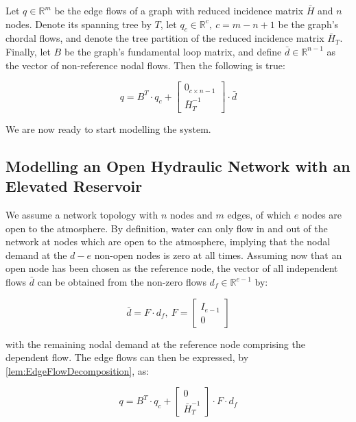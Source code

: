 \begin{lemma}\label{lem:EdgeFlowDecomposition}
	Let $q \in \mathbb{R}^m$ be the edge flows of a graph with reduced incidence matrix $\bar{H}$ and $n$ nodes. Denote its spanning tree by $T$, let $q_c \in \mathbb{R}^c, \ c = m-n+1$ be the graph's chordal flows, and denote the tree partition of the reduced incidence matrix $\bar{H}_T$. Finally, let $B$ be the graph's fundamental loop matrix, and define $\bar{d} \in \mathbb{R}^{n-1}$ as the vector of non-reference nodal flows. Then the following is true:
	
	\begin{equation}\label{eq:EdgeFlowDecomposition}
		q = B^T\cdot q_c +
		\begin{bmatrix}
			0_{c \times n-1} \\ \bar{H}_T^{-1} 
		\end{bmatrix}
		\cdot \bar{d}
	\end{equation}
\end{lemma}

We are now ready to start modelling the system.

\subsection{Modelling an Open Hydraulic Network with an Elevated Reservoir}\label{subsec:ModelWithTank}

We assume a network topology with $n$ nodes and $m$ edges, of which $e$ nodes are open to the atmosphere. By definition, water can only flow in and out of the network at nodes which are open to the atmosphere, implying that the nodal demand at the $d-e$ non-open nodes is zero at all times. Assuming now that an open node has been chosen as the reference node, the vector of all independent flows $\bar{d}$ can be obtained from the non-zero flows $d_f \in \mathbb{R}^{e-1}$ by:

\begin{equation}\label{eq:IndependentFlows}
	\bar{d} = F\cdot d_f, \ F = \begin{bmatrix}
		I_{e-1} \\ 0
	\end{bmatrix}
\end{equation}

with the remaining nodal demand at the reference node comprising the dependent flow. The edge flows can then be expressed, by \cref{lem:EdgeFlowDecomposition}, as:

\begin{equation}\label{eq:EdgeFlows}
	q = B^T\cdot q_c +
	\begin{bmatrix} 0 \\ \bar{H}_T^{-1} \end{bmatrix} \cdot F \cdot d_f
\end{equation}

